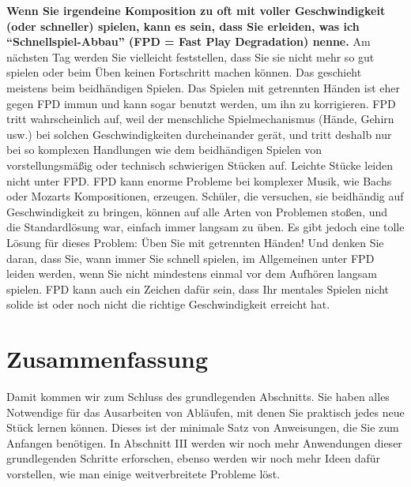 \hypertarget{fpd}{}

\textbf{Wenn Sie irgendeine Komposition zu oft mit voller Geschwindigkeit (oder schneller) spielen, kann es sein, dass Sie erleiden, was ich \enquote{Schnellspiel-Abbau} (FPD = Fast Play Degradation) nenne.}
Am nächsten Tag werden Sie vielleicht feststellen, dass Sie sie nicht mehr so gut spielen oder beim Üben keinen Fortschritt machen können.
Das geschieht meistens beim beidhändigen Spielen.
Das Spielen mit getrennten Händen ist eher gegen FPD immun und kann sogar benutzt werden, um ihn zu korrigieren.
FPD tritt wahrscheinlich auf, weil der menschliche Spielmechanismus (Hände, Gehirn usw.) bei solchen Geschwindigkeiten durcheinander gerät, und tritt deshalb nur bei so komplexen Handlungen wie dem beidhändigen Spielen von vorstellungsmäßig oder technisch schwierigen Stücken auf.
Leichte Stücke leiden nicht unter FPD.
FPD kann enorme Probleme bei komplexer Musik, wie Bachs oder Mozarts Kompositionen, erzeugen.
Schüler, die versuchen, sie beidhändig auf Geschwindigkeit zu bringen, können auf alle Arten von Problemen stoßen, und die Standardlösung war, einfach immer langsam zu üben.
Es gibt jedoch eine tolle Lösung für dieses Problem: Üben Sie mit getrennten Händen!
Und denken Sie daran, dass Sie, wann immer Sie schnell spielen, im Allgemeinen unter FPD leiden werden, wenn Sie nicht mindestens einmal vor dem Aufhören langsam spielen.
FPD kann auch ein Zeichen dafür sein, dass Ihr mentales Spielen nicht solide ist oder noch nicht die richtige Geschwindigkeit erreicht hat.


\section{Zusammenfassung}
\label{c1ii26}

Damit kommen wir zum Schluss des grundlegenden Abschnitts.
Sie haben alles Notwendige für das Ausarbeiten von Abläufen, mit denen Sie praktisch jedes neue Stück lernen können.
Dieses ist der minimale Satz von Anweisungen, die Sie zum Anfangen benötigen.
In Abschnitt III werden wir noch mehr Anwendungen dieser grundlegenden Schritte erforschen, ebenso werden wir noch mehr Ideen dafür vorstellen, wie man einige weitverbreitete Probleme löst.




